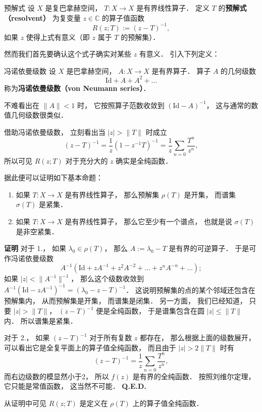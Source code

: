 

\begin{definition}{预解式}
设 $X$ 是复巴拿赫空间， $T:X\to X$ 是有界线性算子． 定义 $T$ 的\textbf{预解式（resolvent）} 为复变量 $z\in\mathbb{C}$ 的算子值函数
$$
R(z;T):=(z-T)^{-1},
$$
如果 $z$ 使得上式有意义（即 $z$ 属于 $T$ 的预解集）．
\end{definition}

然而我们首先要确认这个式子确实对某些 $z$ 有意义． 引入下列定义：

\begin{definition}{冯诺依曼级数}
设 $X$ 是巴拿赫空间， $A:X\to X$ 是有界算子． 算子 $A$ 的几何级数
$$
\text{Id}+A+A^2+\dots
$$
称为\textbf{冯诺依曼级数（von Neumann series）}．
\end{definition}
不难看出在 $\|A\|<1$ 时， 它按照算子范数收敛到 $(\text{Id}-A)^{-1}$， 这与通常的数值几何级数很类似． 

借助冯诺依曼级数， 立刻看出当 $|z|>\|T\|$ 时成立
$$
(z-T)^{-1}
=\frac{1}{z}(1-z^{-1}T)^{-1}
=\frac{1}{z}\sum_{n=0}\frac{T^n}{z^n},
$$
所以可见 $R(z;T)$ 对于充分大的 $z$ 确实是全纯函数．

据此便可以证明如下基本命题：

\begin{theorem}{}
\begin{enumerate}
\item 如果 $T:X\to X$ 是有界线性算子， 那么预解集 $\rho(T)$ 是开集， 而谱集 $\sigma(T)$ 是紧集．
\item 如果 $T:X\to X$ 是有界线性算子， 那么它至少有一个谱点， 也就是说 $\sigma(T)$ 是非空紧集．
\end{enumerate}
\end{theorem}
\textbf{证明} 
对于 1.， 如果 $\lambda_0\in\rho(T)$， 那么 $A:=\lambda_0-T$ 是有界的可逆算子． 于是可作冯诺依曼级数
$$
A^{-1}(\text{Id}+zA^{-1}+z^2A^{-2}+\dots+z^nA^{-n}+\dots);
$$
如果 $|z|<\|A^{-1}\|^{-1}$， 那么这个级数收敛到 $A^{-1}(\text{Id}-zA^{-1})^{-1}=(\lambda_0-z-T)^{-1}$． 这说明预解集的点的某个邻域还包含在预解集内， 从而预解集是开集， 而谱集是闭集． 另一方面， 我们已经知道， 只要 $|z|>\|T\|$， $(z-T)^{-1}$ 便是全纯函数， 于是谱集包含在圆 $|z|\leq\|T\|$ 内． 所以谱集是紧集．

对于 2.， 如果 $(z-T)^{-1}$ 对于所有复数 $z$ 都存在， 那么根据上面的级数展开， 可以看出它是全复平面上的算子值全纯函数， 而且由于 $|z|>2\|T\|$ 时有
$$
(z-T)^{-1}=\frac{1}{z}\sum_{n=0}\frac{T^n}{z^n},
$$
而右边级数的模显然小于2， 所以 $f(z)$ 是有界的全纯函数． 按照刘维尔定理， 它只能是常值函数， 这当然不可能． \textbf{Q.E.D.}

从证明中可见 $R(z;T)$ 是定义在 $\rho(T)$ 上的算子值全纯函数．